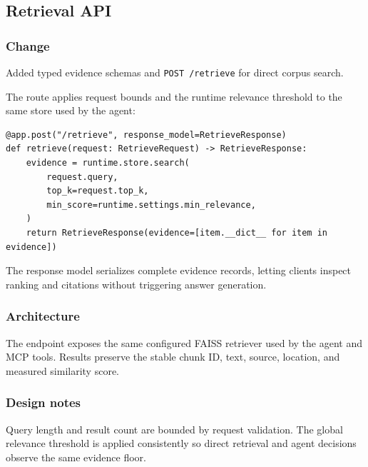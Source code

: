 
\subsection{Retrieval API}


\subsubsection{Change}

Added typed evidence schemas and \texttt{POST\ /retrieve} for direct corpus search.

The route applies request bounds and the runtime relevance threshold to the same store used by the agent:

\begin{verbatim}
@app.post("/retrieve", response_model=RetrieveResponse)
def retrieve(request: RetrieveRequest) -> RetrieveResponse:
    evidence = runtime.store.search(
        request.query,
        top_k=request.top_k,
        min_score=runtime.settings.min_relevance,
    )
    return RetrieveResponse(evidence=[item.__dict__ for item in evidence])
\end{verbatim}

The response model serializes complete evidence records, letting clients inspect ranking and citations without triggering answer generation.

\subsubsection{Architecture}

The endpoint exposes the same configured FAISS retriever used by the agent and MCP tools. Results preserve the stable chunk ID, text, source, location, and measured similarity score.

\subsubsection{Design notes}

Query length and result count are bounded by request validation. The global relevance threshold is applied consistently so direct retrieval and agent decisions observe the same evidence floor.

